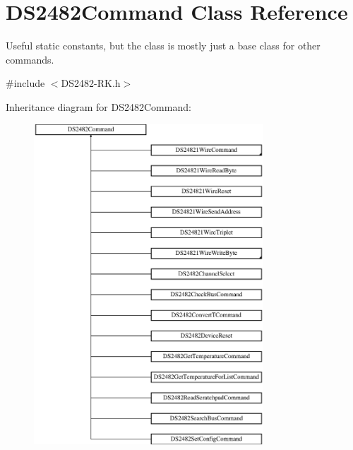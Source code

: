 \hypertarget{class_d_s2482_command}{}\section{D\+S2482\+Command Class Reference}
\label{class_d_s2482_command}


Useful static constants, but the class is mostly just a base class for other commands.  




{\ttfamily \#include $<$D\+S2482-\/\+R\+K.\+h$>$}

Inheritance diagram for D\+S2482\+Command\+:\begin{figure}[H]
\begin{center}
\leavevmode
\includegraphics[height=12.000000cm]{class_d_s2482_command}
\end{center}
\end{figure}
